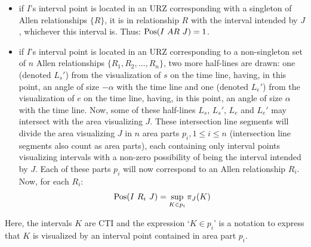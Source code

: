 \begin{itemize}
	\item if $I$'s interval point is located in an URZ corresponding with a singleton of Allen relationships $\{R\}$, it is in relationship $R$ with the interval intended by $J$, whichever this interval is. Thus: $\Pos(I\ AR\ J) = 1$.
	\item if $I$'s interval point is located in an URZ corresponding to a non-singleton set of $n$ Allen relationships $\{R_1, R_2, \ldots, R_n\}$, two more half-lines are drawn: one (denoted $L_s'$) from the visualization of $s$ on the time line, having, in this point, an angle of size $-\alpha$ with the time line and one (denoted $L_e'$) from the visualization of $e$ on the time line, having, in this point, an angle of size $\alpha$ with the time line. Now, some of these half-lines $L_s$, $L_s'$, $L_e$ and $L_e'$ may intersect with the area visualizing $J$. These intersection line segments will divide the area visualizing $J$ in $n$ area parts $p_i, 1 \leq i \leq n$ (intersection line segments also count as area parts), each containing only interval points visualizing intervals with a non-zero possibility of being the interval intended by $J$. Each of these parts $p_i$ will now correspond to an Allen relationship $R_i$. Now, for each $R_i$:
	\begin{equation}
		\operatorname{Pos}(I\ R_i\ J) = \sup_{K \in p_i} \pi_J(K)
	\end{equation}
\end{itemize}

Here, the intervals $K$ are CTI and the expression `$K \in p_i$' is a notation to express that $K$ is visualized by an interval point contained in area part $p_i$.



